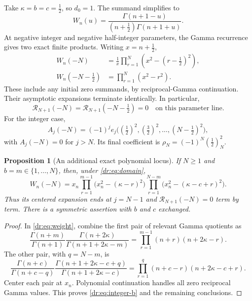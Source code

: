 \documentclass[11pt,letterpaper]{article}
\numberwithin{equation}{section}
\newtheorem{proposition}[theorem]{Proposition}
\theoremstyle{definition}
\theoremstyle{remark}
\newcommand{\Rcal}{\mathcal R}
\begin{document}
Take $\kappa=b=c=\tfrac12$, so $d_0=1$. The summand simplifies to
\begin{equation}
 W_n(u)=\frac{\Gamma(n+1-u)}{(n+\tfrac12)\Gamma(n+1+u)}.
 \label{dr:eq:half-weight}
\end{equation}
At negative integer and negative half-integer parameters, the Gamma
recurrence gives two exact finite products. Writing $x=n+\tfrac12$,
\begin{align}
 W_n(-N)&=\frac1x\prod_{r=1}^N\left(x^2-(r-\tfrac12)^2\right),
        \label{dr:eq:integer-product}\\
 W_n(-N-\tfrac12)&=\prod_{r=1}^N(x^2-r^2).
        \label{dr:eq:half-product}
\end{align}
These include any initial zero summands, by reciprocal-Gamma continuation.
Their asymptotic expansions terminate identically. In particular,
\begin{equation}
 \Rcal_{N+1}(-N)=\Rcal_{N+1}(-N-\tfrac12)=0
 \quad\text{on this parameter line}.
 \label{dr:eq:zero-remainders}
\end{equation}
For the integer case,
\begin{equation}
 A_j(-N)=(-1)^j e_j\bigl((\tfrac12)^2,(\tfrac32)^2,
                         \ldots,(N-\tfrac12)^2\bigr),
 \label{dr:eq:elementary-coeff}
\end{equation}
with $A_j(-N)=0$ for $j>N$. Its final coefficient is
$\rho_N=(-1)^N(\tfrac12)_N^2$.

\begin{proposition}[An additional exact polynomial locus]
\label{dr:prop:integer-b}
If $N\geq1$ and $b=m\in\{1,\ldots,N\}$, then, under
\eqref{dr:eq:domain},
\begin{equation}
 W_n(-N)=x_n
 \prod_{r=1}^{m-1}\bigl(x_n^2-(\kappa-r)^2\bigr)
 \prod_{r=1}^{N-m}\bigl(x_n^2-(\kappa-c+r)^2\bigr).
 \label{dr:eq:integer-b}
\end{equation}
Thus its centered expansion ends at $j=N-1$ and
$\Rcal_{N+1}(-N)=0$ term by term. There is a symmetric assertion with
$b$ and $c$ exchanged.
\end{proposition}

\begin{proof}
In \eqref{dr:eq:weight}, combine the first pair of relevant Gamma
quotients as
\[
 \frac{\Gamma(n+m)}{\Gamma(n+1)}
 \frac{\Gamma(n+2\kappa)}{\Gamma(n+1+2\kappa-m)}
 =\prod_{r=1}^{m-1}(n+r)(n+2\kappa-r).
\]
The other pair, with $q=N-m$, is
\[
 \frac{\Gamma(n+c)}{\Gamma(n+c-q)}
 \frac{\Gamma(n+1+2\kappa-c+q)}{\Gamma(n+1+2\kappa-c)}
 =\prod_{r=1}^{q}(n+c-r)(n+2\kappa-c+r).
\]
Center each pair at $x_n$. Polynomial continuation handles all zero
reciprocal Gamma values. This proves \eqref{dr:eq:integer-b} and the
remaining conclusions.
\end{proof}
\end{document}
